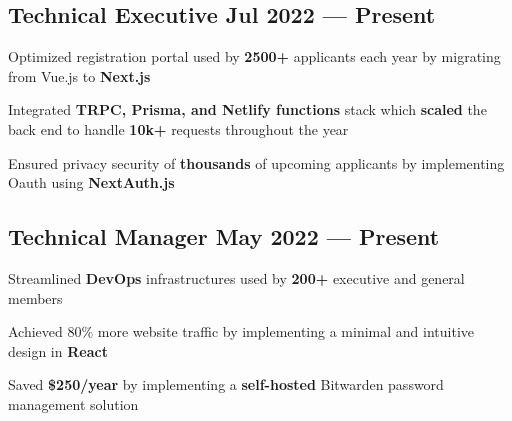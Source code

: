 \subsection{{Technical Executive \hfill Jul 2022 --- Present}}
\begin{zitemize}
    \item Optimized registration portal used by \textbf{2500+} applicants each year by migrating from Vue.js to \textbf{Next.js}
    \item Integrated \textbf{TRPC, Prisma, and Netlify functions} stack which \textbf{scaled} the back end to handle \textbf{10k+} requests throughout the year
    \item Ensured privacy security of \textbf{thousands} of upcoming applicants by implementing Oauth using \textbf{NextAuth.js}
\end{zitemize}

\vspace{0.3cm}\subsection{{Technical Manager  \hfill May 2022 --- Present}}
\begin{zitemize}
    \item Streamlined \textbf{DevOps} infrastructures used by \textbf{200+} executive and general members
    \item Achieved 80\% more website traffic by implementing a minimal and intuitive design in \textbf{React}
    \item Saved \textbf{\$250/year} by implementing a \textbf{self-hosted} Bitwarden password management solution

\end{zitemize}